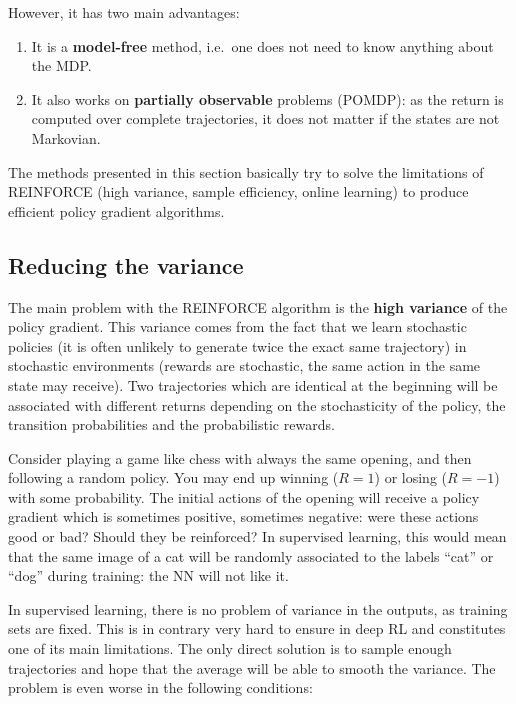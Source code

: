 \documentclass[
  letterpaper,
  DIV=11,
  numbers=noendperiod]{scrreprt}
\providecommand{\tightlist}{%
  \setlength{\itemsep}{0pt}\setlength{\parskip}{0pt}}\usepackage{longtable,booktabs,array}
\begin{document}
However, it has two main advantages:

\begin{enumerate}
\def\labelenumi{\arabic{enumi}.}
\tightlist
\item
  It is a \textbf{model-free} method, i.e.~one does not need to know
  anything about the MDP.
\item
  It also works on \textbf{partially observable} problems (POMDP): as
  the return is computed over complete trajectories, it does not matter
  if the states are not Markovian.
\end{enumerate}

The methods presented in this section basically try to solve the
limitations of REINFORCE (high variance, sample efficiency, online
learning) to produce efficient policy gradient algorithms.

\hypertarget{reducing-the-variance}{%
\subsection{Reducing the variance}\label{reducing-the-variance}}

The main problem with the REINFORCE algorithm is the \textbf{high
variance} of the policy gradient. This variance comes from the fact that
we learn stochastic policies (it is often unlikely to generate twice the
exact same trajectory) in stochastic environments (rewards are
stochastic, the same action in the same state may receive). Two
trajectories which are identical at the beginning will be associated
with different returns depending on the stochasticity of the policy, the
transition probabilities and the probabilistic rewards.

Consider playing a game like chess with always the same opening, and
then following a random policy. You may end up winning (\(R=1\)) or
losing (\(R=-1\)) with some probability. The initial actions of the
opening will receive a policy gradient which is sometimes positive,
sometimes negative: were these actions good or bad? Should they be
reinforced? In supervised learning, this would mean that the same image
of a cat will be randomly associated to the labels ``cat'' or ``dog''
during training: the NN will not like it.

In supervised learning, there is no problem of variance in the outputs,
as training sets are fixed. This is in contrary very hard to ensure in
deep RL and constitutes one of its main limitations. The only direct
solution is to sample enough trajectories and hope that the average will
be able to smooth the variance. The problem is even worse in the
following conditions:
\end{document}
